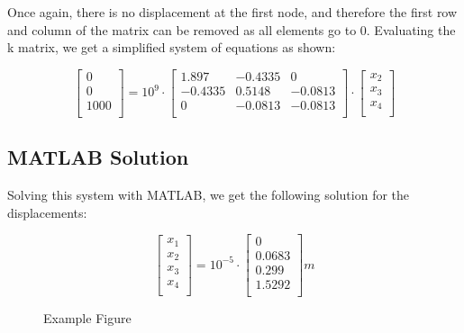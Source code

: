 \documentclass[8pt]{article}
\begin{document}
Once again, there is no displacement at the first node, and therefore the first row and column of the matrix can be removed as all elements go to 0. Evaluating the k matrix, we get a simplified system of equations as shown:

\[
\begin{bmatrix}
    0 \\ 
    0 \\ 
    1000 \\
\end{bmatrix}
=
10^9 \cdot
\begin{bmatrix}
    1.897 & -0.4335 & 0 \\
    -0.4335 & 0.5148 & -0.0813 \\
    0 & -0.0813 & -0.0813\\
\end{bmatrix}
\cdot
\begin{bmatrix}
    x_2 \\ 
    x_3 \\ 
    x_4 \\
\end{bmatrix}
\]


\subsection{MATLAB Solution}

Solving this system with MATLAB, we get the following solution for the displacements:

\begin{figure}[h!]
    \begin{minipage}{0.3\textwidth}
        \centering
        \[
        \begin{bmatrix}
            x_1 \\
            x_2 \\
            x_3 \\
            x_4 \\

        \end{bmatrix}
        =
        10^{-5} \cdot
        \begin{bmatrix}
            0 \\
            0.0683 \\
            0.299 \\
            1.5292 \\
        \end{bmatrix}
        m
        \]
        \end{minipage}\hfill
        \begin{minipage}{0.6\textwidth}
            \centering
            \caption{Example Figure}
        \end{minipage}
\end{figure}
\end{document}
